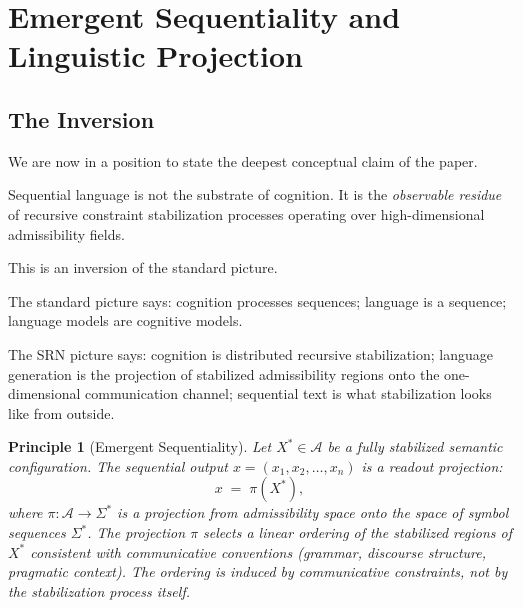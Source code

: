 \documentclass[11pt, a4paper]{article}
\theoremstyle{srn}
\newtheorem{principle}{Principle}[section]
\theoremstyle{srnremark}
\newcommand{\Aspace}{\mathcal{A}}           %
\begin{document}
\section{Emergent Sequentiality and Linguistic Projection}
\label{sec:emergent}

\subsection{The Inversion}

We are now in a position to state the deepest conceptual claim of the
paper.

Sequential language is not the substrate of cognition.
It is the \emph{observable residue} of recursive constraint
stabilization processes operating over high-dimensional admissibility
fields.

This is an inversion of the standard picture.

The standard picture says: cognition processes sequences; language is a
sequence; language models are cognitive models.

The SRN picture says: cognition is distributed recursive stabilization;
language generation is the projection of stabilized admissibility
regions onto the one-dimensional communication channel; sequential text
is what stabilization looks like from outside.

\begin{principle}[Emergent Sequentiality]
\label{prin:sequentiality}
Let $X^* \in \Aspace$ be a fully stabilized semantic configuration.
The sequential output $x = (x_1, x_2, \ldots, x_n)$ is a
\emph{readout projection}:
\[
  x \;=\; \pi\!\left(X^*\right),
\]
where $\pi : \Aspace \to \Sigma^*$ is a projection from admissibility space
onto the space of symbol sequences $\Sigma^*$.
The projection $\pi$ selects a linear ordering of the stabilized
regions of $X^*$ consistent with communicative conventions
(grammar, discourse structure, pragmatic context).
The ordering is \emph{induced} by communicative constraints, not by
the stabilization process itself.
\end{principle}
\end{document}
